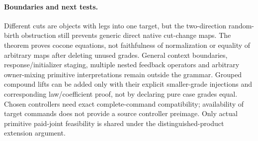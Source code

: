 \documentclass[11pt]{article}\usepackage{amsmath,amssymb,amsthm,geometry}\geometry{margin=1in}\newtheorem{definition}{Definition}\newtheorem{theorem}[definition]{Theorem}
\begin{document}
\paragraph{Boundaries and next tests.} Different cuts are objects with legs into one target, but the two-direction random-birth obstruction still prevents generic direct native cut-change maps. The theorem proves cocone equations, not faithfulness of normalization or equality of arbitrary maps after deleting unused grades. General context boundaries, response/initializer staging, multiple nested feedback operators and arbitrary owner-mixing primitive interpretations remain outside the grammar. Grouped compound lifts can be added only with their explicit smaller-grade injections and corresponding law/coefficient proof, not by declaring pure case grades equal. Chosen controllers need exact complete-command compatibility; availability of target commands does not provide a source controller preimage. Only actual primitive paid-joint feasibility is shared under the distinguished-product extension argument.
\end{document}
